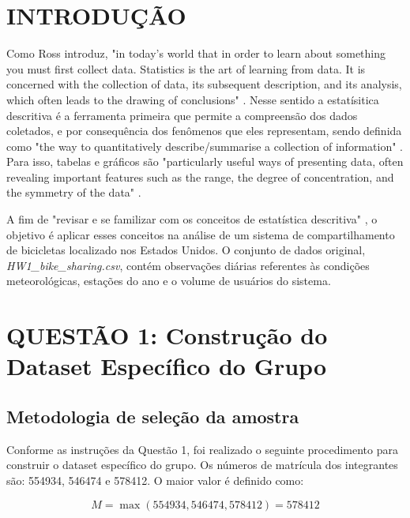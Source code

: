 \documentclass[12pt,a4paper]{article}
\begin{document}


\newpage
\tableofcontents
\newpage

\section*{INTRODUÇÃO}\label{sec:introducao}


Como Ross introduz, "in today’s world that in order to learn about something you must first collect data. Statistics is the art of learning from data. It is concerned with the collection of data, its subsequent description, and its analysis, which often leads to the drawing of conclusions" \cite{ross2020}. Nesse sentido a estatísitica descritiva é a ferramenta primeira que permite a compreensão dos dados coletados, e por consequência dos fenômenos que eles representam, sendo definida como "the way to quantitatively describe/summarise a collection of information" \cite{l01_freq}. Para isso, tabelas e gráficos são "particularly useful ways of presenting data, often revealing important features such as the range, the degree of concentration, and the symmetry of the data" \cite{ross2020}. 

A fim de "revisar e se familizar com os conceitos de estatística descritiva" \cite{hw1_assignment}, o objetivo é aplicar esses conceitos na análise de um sistema de compartilhamento de bicicletas localizado nos Estados Unidos. O conjunto de dados original, \textit{HW1\_bike\_sharing.csv}, contém observações diárias referentes às condições meteorológicas, estações do ano e o volume de usuários do sistema. 

\section{QUESTÃO 1: Construção do Dataset Específico do Grupo}\label{sec:questao1}

\subsection{Metodologia de seleção da amostra}

Conforme as instruções da Questão 1, foi realizado o seguinte procedimento para construir o dataset específico do grupo. Os números de matrícula dos integrantes são: 554934, 546474 e 578412. O maior valor é definido como:

\begin{equation}
M = \max(554934, 546474, 578412) = 578412
\end{equation}
\end{document}
